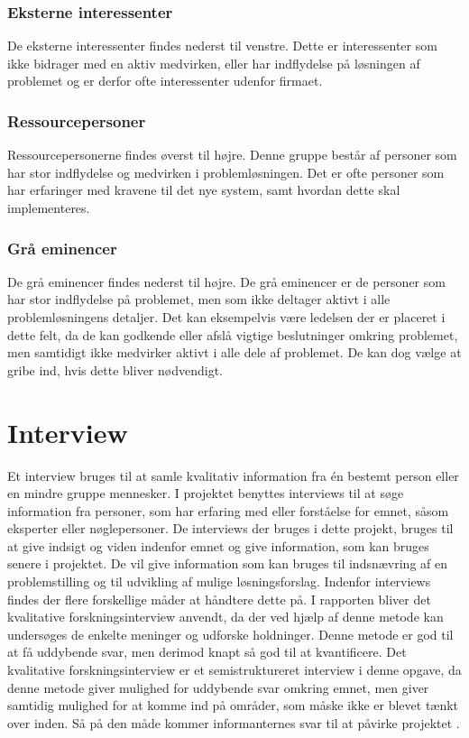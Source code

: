 \subsubsection{Eksterne interessenter}
De eksterne interessenter findes nederst til venstre. Dette er interessenter som ikke bidrager med en aktiv medvirken, eller har indflydelse på løsningen af problemet og er derfor ofte interessenter udenfor firmaet. 

\subsubsection{Ressourcepersoner}
Ressourcepersonerne findes øverst til højre. Denne gruppe består af personer som har stor indflydelse og medvirken i problemløsningen. Det er ofte personer som har erfaringer med kravene til det nye system, samt hvordan dette skal implementeres.

\subsubsection{Grå eminencer}
De grå eminencer findes nederst til højre. De grå eminencer er de personer som har stor indflydelse på problemet, men som ikke deltager aktivt i alle problemløsningens detaljer. Det kan eksempelvis være ledelsen der er placeret i dette felt, da de kan godkende eller afslå vigtige beslutninger omkring problemet, men samtidigt ikke medvirker aktivt i alle dele af problemet. De kan dog vælge at gribe ind, hvis dette bliver nødvendigt.

\section{Interview}
Et interview bruges til at samle kvalitativ information fra én bestemt person eller en mindre gruppe mennesker. I projektet benyttes interviews til at søge information fra personer, som har erfaring med eller forståelse for emnet, såsom eksperter eller nøglepersoner. De interviews der bruges i dette projekt, bruges til at give indsigt og viden indenfor emnet og give information, som kan bruges senere i projektet. De vil give information som kan bruges til indsnævring af en problemstilling og til udvikling af mulige løsningsforslag.
Indenfor interviews findes der flere forskellige måder at håndtere dette på. I rapporten bliver det kvalitative forskningsinterview anvendt, da der ved hjælp af denne metode kan undersøges de enkelte meninger og udforske holdninger. Denne metode er god til at få uddybende svar, men derimod knapt så god til at kvantificere.
Det kvalitative forskningsinterview er et semistruktureret interview i denne opgave, da denne metode giver mulighed for uddybende svar omkring emnet, men giver samtidig mulighed for at komme ind på områder, som måske ikke er blevet tænkt over inden. Så på den måde kommer informanternes svar til at påvirke projektet \citep{BjarneHjorthAndersen, kvale2009}.

